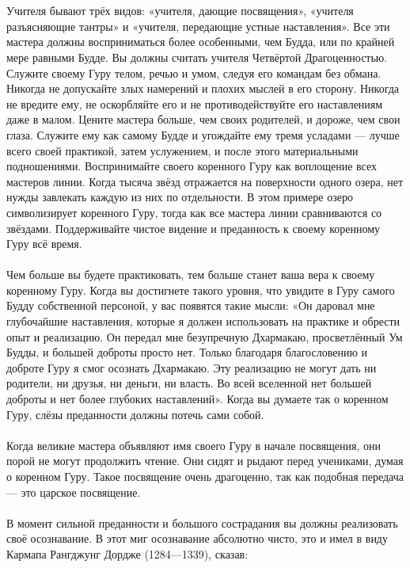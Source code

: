 \\ \\ Учителя бывают трёх видов: «учителя, дающие посвящения», «учителя разъясняющие тантры» и «учителя, передающие устные наставления». Все эти мастера должны восприниматься более особенными, чем Будда, или по крайней мере равными Будде. Вы должны считать учителя Четвёртой Драгоценностью. Служите своему Гуру телом, речью и умом, следуя его командам без обмана. Никогда не допускайте злых намерений и плохих мыслей в его сторону. Никогда не вредите ему, не оскорбляйте его и не противодействуйте его наставлениям даже в малом. Цените мастера больше, чем своих родителей, и дороже, чем свои глаза. Служите ему как самому Будде и угождайте ему тремя усладами — лучше всего своей практикой, затем услужением, и после этого материальными подношениями. Воспринимайте своего коренного Гуру как воплощение всех мастеров линии. Когда тысяча звёзд отражается на поверхности одного озера, нет нужды завлекать каждую из них по отдельности. В этом примере озеро символизирует коренного Гуру, тогда как все мастера линии сравниваются со звёздами. Поддерживайте чистое видение и преданность к своему коренному Гуру всё время.
\\ \\ Чем больше вы будете практиковать, тем больше станет ваша вера к своему коренному Гуру. Когда вы достигнете такого уровня, что увидите в Гуру самого Будду собственной персоной, у вас появятся такие мысли: «Он даровал мне глубочайшие наставления, которые я должен использовать на практике и обрести опыт и реализацию. Он передал мне безупречную Дхармакаю, просветлённый Ум Будды, и большей доброты просто нет. Только благодаря благословению и доброте Гуру я смог осознать Дхармакаю. Эту реализацию не могут дать ни родители, ни друзья, ни деньги, ни власть. Во всей вселенной нет большей доброты и нет более глубоких наставлений». Когда вы думаете так о коренном Гуру, слёзы преданности должны потечь сами собой.
\\ \\ Когда великие мастера объявляют имя своего Гуру в начале посвящения, они порой не могут продолжить чтение. Они сидят и рыдают перед учениками, думая о коренном Гуру. Такое посвящение очень драгоценно, так как подобная переда\-ча — это царское посвящение.
\\ \\ В момент сильной преданности и большого сострадания вы должны реализовать своё осознавание. В этот миг осознавание абсолютно чисто, это и имел в виду Кармапа Рангджунг Дордже (1284—1339), сказав:
